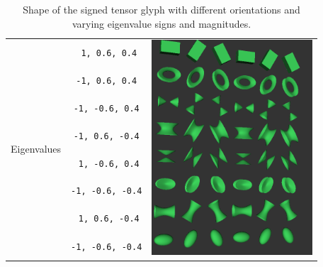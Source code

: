 \documentclass{InsightArticle}
\begin{document}
%
%

\renewcommand{\arraystretch}{2.09}
\begin{table}[ht]
  \begin{tabular}{ccc}
    \hline
    \multirow{8}{*}{Eigenvalues}
    &\texttt{ 1,  0.6,  0.4}&\multirow{8}{*}{\includegraphics[width=6cm]{SignedEigenvalueTensorGlyphMatrix}} \\
    &\texttt{-1,  0.6,  0.4}& \\
    &\texttt{-1, -0.6,  0.4}& \\
    &\texttt{-1,  0.6, -0.4}& \\
    &\texttt{ 1, -0.6,  0.4}& \\
    &\texttt{-1, -0.6, -0.4}& \\
    &\texttt{ 1,  0.6, -0.4}& \\
    &\texttt{-1, -0.6, -0.4}& \\
    \hline
  \end{tabular}
  \caption{Shape of the signed tensor glyph with different orientations and
  varying eigenvalue signs and magnitudes.}
\end{table}



%
%
\end{document}
